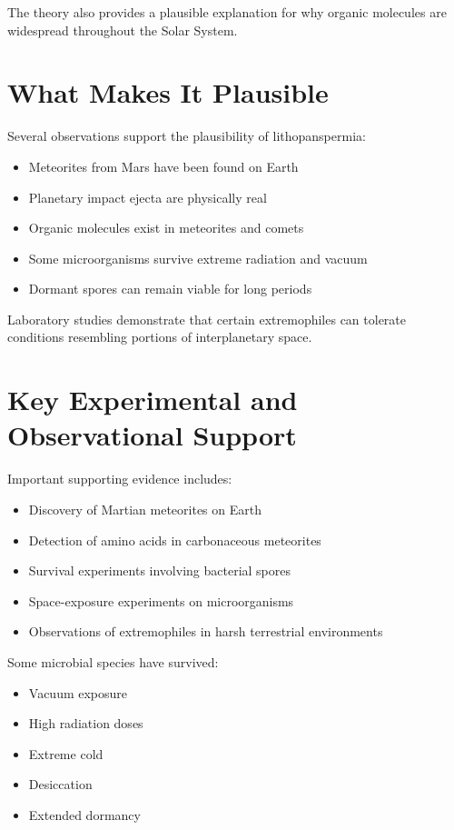 \documentclass[
  oneside]{book}
\providecommand{\tightlist}{%
  \setlength{\itemsep}{0pt}\setlength{\parskip}{0pt}}
\begin{document}
The theory also provides a plausible explanation for why organic molecules are widespread throughout the Solar System.

\section{What Makes It Plausible}\label{what-makes-it-plausible-7}

Several observations support the plausibility of lithopanspermia:

\begin{itemize}
\tightlist
\item
  Meteorites from Mars have been found on Earth
\item
  Planetary impact ejecta are physically real
\item
  Organic molecules exist in meteorites and comets
\item
  Some microorganisms survive extreme radiation and vacuum
\item
  Dormant spores can remain viable for long periods
\end{itemize}

Laboratory studies demonstrate that certain extremophiles can tolerate conditions resembling portions of interplanetary space.

\section{Key Experimental and Observational Support}\label{key-experimental-and-observational-support-7}

Important supporting evidence includes:

\begin{itemize}
\tightlist
\item
  Discovery of Martian meteorites on Earth
\item
  Detection of amino acids in carbonaceous meteorites
\item
  Survival experiments involving bacterial spores
\item
  Space-exposure experiments on microorganisms
\item
  Observations of extremophiles in harsh terrestrial environments
\end{itemize}

Some microbial species have survived:

\begin{itemize}
\tightlist
\item
  Vacuum exposure
\item
  High radiation doses
\item
  Extreme cold
\item
  Desiccation
\item
  Extended dormancy
\end{itemize}
\end{document}
